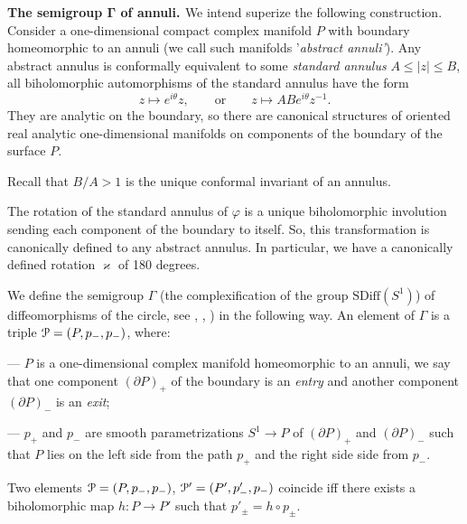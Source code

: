 \documentclass[]{amsart}
\newcounter{sec}
\newcounter{punct}[sec]
\def\punct{\refstepcounter{punct}{\arabic{sec}.\arabic{punct}.  }}
\def\COUNTERS{\addtocounter{sec}{1}
              \setcounter{punct}{0}
          \setcounter{equation}{0}
          \setcounter{theorem}{0}
          }
\def\phi{\varphi}
\def\kappa{\varkappa}
\def\le{\leqslant}
\def\cP{\EuScript P}
\def\sm{\smallskip}
\def\SDiff{\mathrm{SDiff}}
\begin{document}
\COUNTERS


{\bf \punct The semigroup $\boldsymbol{\Gamma}$ of annuli.%
\label{ss:Gamma}} We intend superize the following construction. 
Consider a one-dimensional compact complex manifold $P$
with boundary
 homeomorphic to an annuli (we call such manifolds '{\it abstract annuli'}). 
 Any abstract annulus is conformally equivalent to some {\it standard annulus} $A\le |z|\le B$,
all biholomorphic automorphisms of the standard annulus
have the form
\begin{equation}
z\mapsto e^{i\theta} z,\qquad
\text{or} \qquad z\mapsto AB e^{i\theta} z^{-1}.
\label{eq:automorphisms}
\end{equation}
 They are analytic on the boundary, 
 so there are canonical structures of  oriented real  analytic %
 one-dimensional manifolds  on components of the boundary
 of the surface $P$.
 
 Recall that $B/A>1$ is the unique conformal invariant of an annulus.
 
 \sm 
 
 The rotation  of the standard annulus of $\phi$ is a unique biholomorphic
 involution sending  each component of the boundary to itself. So, this 
 transformation is canonically defined to any abstract annulus.
 In particular, we have a canonically defined rotation $\kappa$ of
 180 degrees.
 
 
\sm 
 
 We define the semigroup $\Gamma$ (the complexification of the group
 $\SDiff(S^1)$)
 of diffeomorphisms of the circle, see \cite{Ner-semigroup}, 
 \cite{Ner-holom}, \cite{Seg2}) in the following way.
 An element of $\Gamma$ is a triple $\cP=(P,p_-,p_-)$,
 where: 
 
 \sm 
 
 --- $P$ is a one-dimensional complex manifold homeomorphic to an annuli, we say that one component $(\partial P)_+$ of
 the boundary is an {\it entry} and another component $(\partial P)_-$ is an
  {\it exit};
 
 \sm 
 
 --- $p_+$ and $p_-$ are smooth parametrizations $S^1\to P$ of 
 $(\partial P)_+$ and $(\partial P)_-$ such that $P$
  lies on the left side from the path $p_+$ and the right  side  side from $p_-$.


\sm



Two elements $\cP=(P,p_-,p_-)$, $\cP'=(P',p'_-,p_-)$ coincide iff there exists a biholomorphic map $h:P\to P'$
such that $p'_\pm=h\circ p_\pm$.
\end{document}
